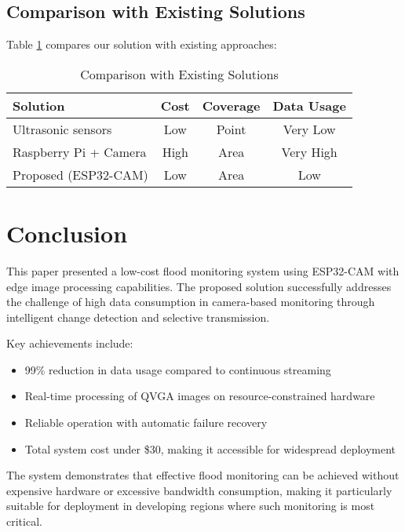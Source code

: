\documentclass[conference]{IEEEtran}
\begin{document}
\subsection{Comparison with Existing Solutions}

Table \ref{tab:comparison} compares our solution with existing approaches:

\begin{table}[htbp]
\caption{Comparison with Existing Solutions}
\begin{center}
\begin{tabular}{|l|c|c|c|}
\hline
\textbf{Solution} & \textbf{Cost} & \textbf{Coverage} & \textbf{Data Usage} \\
\hline
Ultrasonic sensors & Low & Point & Very Low \\
\hline
Raspberry Pi + Camera & High & Area & Very High \\
\hline
Proposed (ESP32-CAM) & Low & Area & Low \\
\hline
\end{tabular}
\label{tab:comparison}
\end{center}
\end{table}

\section{Conclusion}

This paper presented a low-cost flood monitoring system using ESP32-CAM with edge image processing capabilities. The proposed solution successfully addresses the challenge of high data consumption in camera-based monitoring through intelligent change detection and selective transmission.

Key achievements include:
\begin{itemize}
\item 99\% reduction in data usage compared to continuous streaming
\item Real-time processing of QVGA images on resource-constrained hardware
\item Reliable operation with automatic failure recovery
\item Total system cost under \$30, making it accessible for widespread deployment
\end{itemize}

The system demonstrates that effective flood monitoring can be achieved without expensive hardware or excessive bandwidth consumption, making it particularly suitable for deployment in developing regions where such monitoring is most critical.
\end{document}
